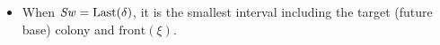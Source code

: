 \documentclass[12pt]{memoir}
\newcommand{\fld}[1]{\ensuremath{\textit{#1\/}}}
\def\B{B}
\newcommand{\cKind}{\fld{cKind}}
\newcommand{\Sweep}{\fld{Sw}}
\newcommand{\front}{\mathrm{front}}
\newcommand{\Last}{\mathrm{Last}}
\newcommand{\Member}{\mathrm{Member}}
\newcommand{\TransferSw}{\mathrm{TransferSw}}
\begin{document}
\begin{definition}
\begin{description}
\begin{itemize}
        \item When \( \Sweep = \Last(\delta) \), it is the smallest interval including the target
              (future  base) colony and \( \front(\xi) \).
        \end{itemize}













\end{description}
\end{definition}
\end{document}
